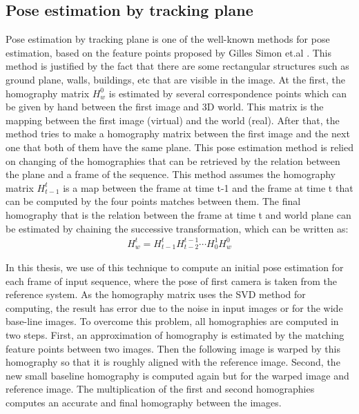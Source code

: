 \subsection{Pose estimation by tracking plane}\label{subsec:pose_estimation_planer_tracking}
Pose estimation by tracking plane is one of the well-known methods for pose estimation, based on the feature points proposed by Gilles Simon et.al \cite{genc2002marker}. This method is justified by the fact that there are some rectangular structures such as ground plane, walls, buildings, etc that are visible in the image. At the first, the homography matrix $H_{w}^{0}$ is estimated by several correspondence points which can be given by hand between the first image and 3D world. This matrix is the mapping between the first image (virtual) and the world (real). After that, the method tries to make a homography matrix between the first image and the next one that both of them have the same plane. This pose estimation method is relied on changing of the homographies that can be retrieved by the relation between the plane and a frame of the sequence. This method assumes the homography matrix $H_{t-1}^{t}$ is a map between the frame at time t-1 and the frame at time t that can be computed by the four points matches between them. The final homography that is the relation between the frame at time t and world plane can be estimated by chaining the successive transformation, which can be written as:
\begin{gather*}
	H_{w}^{t} = H_{t-1}^{t} H_{t-2}^{t-1} \cdots H_{0}^{1} H_{w}^{0}
\end{gather*}\label{eq:homography_world_to_refrence}

In this thesis, we use of this technique to compute an initial pose estimation for each frame of input sequence, where the pose of first camera is taken from the reference system. As the homography matrix uses the SVD method for computing, the result has error due to the noise in input images or for the wide base-line images. To overcome this problem, all homographies are computed in two steps. First, an approximation of homography is estimated by the matching feature points between two images. Then the following image is warped by this homography so that it is roughly aligned with the reference image. Second, the new small baseline homography is computed again but for the warped image and reference image. The multiplication of the first and second homographies computes an accurate and final homography between the images.
